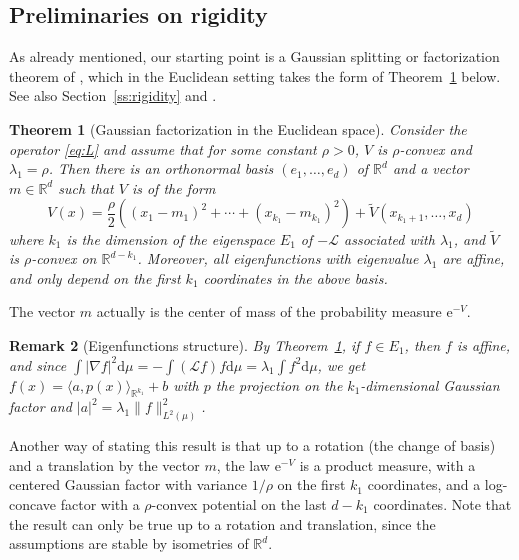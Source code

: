 \documentclass[10pt,reqno]{amsart}
\newtheorem{theorem}{Theorem}[section]
\newtheorem{remark}[theorem]{Remark}
\numberwithin{equation}{section}
\begin{document}
\subsection{Preliminaries on rigidity}

As already mentioned, our starting point is a Gaussian splitting or
factorization theorem of \cite{CZ17}, which in the Euclidean setting takes the
form of Theorem~\ref{thm_split_eucl} below. See also Section~\ref{ss:rigidity}
and \cite[Rem.~3.2]{MR4175749}.

\begin{theorem}[Gaussian factorization in the Euclidean
  space] \label{thm_split_eucl} Consider the operator \eqref{eq:L} and assume
  that for some constant $\rho>0$, $V$ is $\rho$-convex and
  $\lambda_1 = \rho$. Then there is an orthonormal basis $(e_1,\ldots,e_d)$ of
  $\mathbb{R}^d$ and a vector $m \in \mathbb{R}^d$ such that $V$ is of the form
    \begin{equation}
    V(x) = \frac{\rho}{2}((x_1-m_1)^2 + \cdots + (x_{k_1}-m_{k_1})^2) + \widetilde{V}(x_{k_1+1},\ldots,x_d)
  \end{equation}
  where $k_1$ is the dimension of the eigenspace $E_1$ of $-\mathcal{L}$
  associated with $\lambda_1$, and $\widetilde{V}$ is $\rho$-convex on
  $\mathbb{R}^{d-k_1}$. Moreover, all eigenfunctions with eigenvalue
  $\lambda_1$ are affine, and only depend on the first $k_1$ coordinates in
  the above basis.
\end{theorem}

The vector $m$ actually is the center of mass of the probability measure $\mathrm{e}^{-V}$. 

\begin{remark}[Eigenfunctions structure] \label{rem_eigen_grad} By
  Theorem~\ref{thm_split_eucl}, if $f\in E_1$, then $f$ is affine, and since
  $\int |\nabla f|^2\mathrm{d}\mu = -\int (\mathcal{L} f)f\mathrm{d}\mu
  =\lambda_1\int f^2\mathrm{d}\mu$, we get
  $f(x)=\langle a, p(x)\rangle_{\mathbb{R}^{k_1}} + b$ with $p$ the projection
  on the $k_1$-dimensional Gaussian factor and
  $|a|^2 = \lambda_1\|f\|_{L^2(\mu)}^2$.
\end{remark}

Another way of stating this result is that up to a rotation (the change of
basis) and a translation by the vector $m$, the law $\mathrm{e}^{-V}$ is a
product measure, with a centered Gaussian factor with variance $1/\rho$ on the
first $k_1$ coordinates, and a log-concave factor with a $\rho$-convex
potential on the last $d-k_1$ coordinates. Note that the result can only be
true up to a rotation and translation, since the assumptions are stable by
isometries of $\mathbb{R}^d$.
\end{document}

